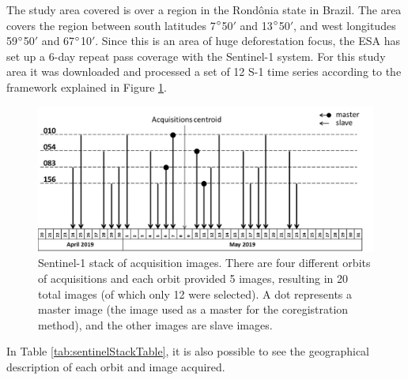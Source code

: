 The study area covered is over a region in the Rondônia state in Brazil. The area covers the region between south latitudes 7$\degree$50$'$ and 13$\degree$50$'$, and west longitudes 59$\degree$50$'$ and 67$\degree$10$'$. Since this is an area of huge deforestation focus, the ESA has set up a 6-day repeat pass coverage with the Sentinel-1 system. For this study area it was downloaded and processed a set of 12 S-1 time series according to the framework explained in Figure \ref{fig:sentinelStack}.

\begin{figure}[H]
    \centering
    \includegraphics[width=\linewidth]{Cap2-Methods/sentinelstack.jpg}
    \caption{Sentinel-1 stack of acquisition images. There are four different orbits of acquisitions and each orbit provided 5 images, resulting in 20 total images (of which only 12 were selected). A dot represents a master image (the image used as a master for the coregistration method), and the other images are slave images.}
    \label{fig:sentinelStack}
\end{figure}{}

In Table \ref{tab:sentinelStackTable}, it is also possible to see the geographical description of each orbit and image acquired.

